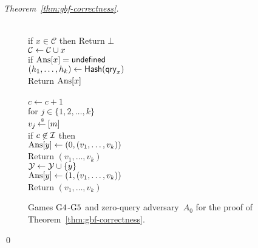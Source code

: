 \begin{proof}[Theorem~\ref{thm:gbf-correctness}]
\begin{figure}[tp]
{{\\
if $x \in \mathcal{C}$ then Return $\bot$\\
${\cal C} \gets {\cal C} \cup x$\\
if $\mathrm{Ans}[x] = \mathsf{undefined}$\\
\nudge $(h_1, \ldots, h_{k}) \gets \mathsf{Hash}(\mathsf{qry}_x)$\\
Return $\mathrm{Ans}[x]$\\
}
{
\\
$c \gets c + 1$\\
for $j \in \{1,2,\ldots,k\}$\\
\nudge $v_j {\:\stackrel{{\scriptscriptstyle \hspace{0.2em}\$}} {\leftarrow}\:} [m]$\\
%
if $c \not\in {\cal I}$ then \\
\nudge $\mathrm{Ans}[y] \gets (0, (v_1, \ldots, v_{k}) )$\\
\nudge Return $\left(v_1,\ldots,v_k\right)$\\
${\cal Y} \gets {\cal Y} \cup \{y\}$\\
$\mathrm{Ans}[y] \gets (1, (v_1, \ldots, v_{k}))$\\
Return $\left(v_1,\ldots,v_k\right)$
}
}
\caption{Games $\text{G4}$-$\text{G5}$ and zero-query adversary~$A_0$ for the
proof of Theorem~\ref{thm:gbf-correctness}.}
\label{fig:gbf-correctness-games2}
\end{figure}
\hfill\qed
\end{proof}
